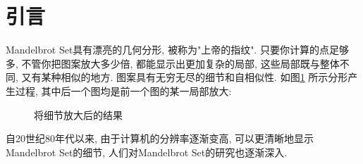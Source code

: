 \documentclass{ctexart}
\begin{document}
\section{引言}
Mandelbrot Set具有漂亮的几何分形, 被称为"上帝的指纹". 只要你计算的点足够多, 不管你把图案放大多少倍, 都能显示出更加复杂的局部, 这些局部既与整体不同, 又有某种相似的地方. 图案具有无穷无尽的细节和自相似性. 如图\ref{fig:wiki} 所示分形产生过程, 其中后一个图均是前一个图的某一局部放大: 
\begin{figure}[!ht]
	\centering
	\caption{将细节放大后的结果}
	\label{fig:wiki}
\end{figure}
\par 自20世纪80年代以来, 由于计算机的分辨率逐渐变高, 可以更清晰地显示Mandelbrot Set的细节, 人们对Mandelbrot Set的研究也逐渐深入.
\end{document}
